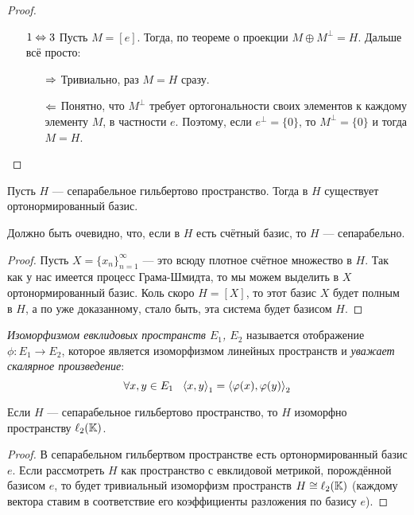 \begin{proof}
\begin{itemize}
		\item[$1 \Leftrightarrow 3$] Пусть $M = [e]$. Тогда, по теореме о проекции $M \oplus M^\bot = H$. Дальше всё просто:
		\begin{itemize}
			\item[$\Rightarrow$] Тривиально, раз $M = H$ сразу.
			
			\item[$\Leftarrow$] Понятно, что $M^\bot$ требует ортогональности своих элементов к каждому элементу $M$, в частности $e$. Поэтому, если $e^\bot = \{0\}$, то $M^\bot = \{0\}$ и тогда $M = H$.
		\end{itemize}
	\end{itemize}
\end{proof}

\begin{theorem}
	Пусть $H$ --- сепарабельное гильбертово пространство. Тогда в $H$ существует ортонормированный базис.
\end{theorem}

\begin{note}
	Должно быть очевидно, что, если в $H$ есть счётный базис, то $H$ --- сепарабельно.
\end{note}

\begin{proof}
	Пусть $X = \{x_n\}_{n = 1}^\infty$ --- это всюду плотное счётное множество в $H$. Так как у нас имеется процесс Грама-Шмидта, то мы можем выделить в $X$ ортонормированный базис. Коль скоро $H = [X]$, то этот базис $X$ будет полным в $H$, а по уже доказанному, стало быть, эта система будет базисом $H$.
\end{proof}

\begin{definition}
	\textit{Изоморфизмом евклидовых пространств $E_1$, $E_2$} называется отображение $\phi \colon E_1 \to E_2$, которое является изоморфизмом линейных пространств и \textit{уважает скалярное произведение}:
	\[
		\forall x, y \in E_1\ \ \left\langle x, y\right\rangle_1 = \left\langle\varphi(x), \varphi(y)\right\rangle_2
	\]
\end{definition}

\begin{theorem}
	Если $H$ --- сепарабельное гильбертово пространство, то $H$ изоморфно пространству $\ell_2(\mathbb{K})$.
\end{theorem}

\begin{proof}
	В сепарабельном гильбертвом пространстве есть ортонормированный базис $e$. Если рассмотреть $H$ как пространство с евклидовой метрикой, порождённой базисом $e$, то будет тривиальный изоморфизм пространств $H \cong \ell_2(\mathbb{K})$ (каждому вектора ставим в соответствие его коэффициенты разложения по базису $e$).
\end{proof}

